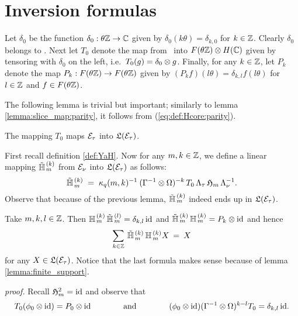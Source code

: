 \section{Inversion formulas}
\label{sect:inversion}


\begin{defn}
Let $\delta_0$ be the function $\delta_0: \theta \ZZ \rarr \CC$
given by $\delta_0(k\theta)=\delta_{k,0}$ for $k\in\ZZ$.
Clearly $\delta_0$ belongs to \KZeven\@. Next let $T_0$ denote the map
from \HC\ into $\FZ \tens \HC$ given by tensoring with $\delta_0$ on the
left, i.e.\ $T_0(g)=\delta_0 \tens g$.
Finally, for any $k\in\ZZ$, let $P_k$ denote the map
$P_k : \FZ \rarr \FZ$ given by  $(P_k f)(l\theta)=\delta_{k,l} f(l\theta)$
for $l\in\ZZ$ and $f\in\FZ$.
\end{defn}

The following lemma is trivial but important; similarly to
lemma \ref{lemma:slice_map:parity}, it follows from (\ref{eq:def:Hcore:parity}).

\begin{lemma}
The  mapping $T_0$ maps $\Hcore_\tau$ into $\calL(\Hcore_\tau)$.
\end{lemma}

\begin{defn}
First recall definition \ref{def:YaH}\@.
Now for any $m,k\in\ZZ$, we define a linear mapping $\Htil{m}{k}$
from $\Hcore_\nu$ into $\calL(\Hcore_\tau)$ as follows:
$$ \Htil{m}{k} \;=\;
   \kq(m,k)^{-1} \: (\Gamma^{-1} \tens \Omega)^{-k}\,
            T_0\, \Lambda_\tau \, \holH{m} \, \Lambda_\nu^{-1}. $$
Observe that because of the previous lemma, $\Htil{m}{k}$ indeed ends up in
$\calL(\Hcore_\tau)$.
\end{defn}


\begin{lemma}
Take $m,k,l\in\ZZ$. Then $\YaH{m}{k} \,\Htil{m}{l} = \delta_{k,l} \,\id$ and\/
$\Htil{m}{k} \,\YaH{m}{k} = P_k \tens \id$ and hence
$$ \sum_{k\in\ZZ}\: \Htil{m}{k}\, \YaH{m}{k} X  \:=\: X $$
for any $X\in \calL(\Hcore_\tau)$.
Notice that the last formula makes sense because of lemma \ref{lemma:finite_support}\@.
\end{lemma}
{\em proof.}
Recall $\holH{m}^{2} = \id$ and observe that
$$ T_0 (\evzero \tens \id) = P_0 \tens \id
             \andspace{4em}
(\evzero \tens \id) (\Gamma^{-1} \tens \Omega)^{k-l}T_0 = \delta_{k,l} \, \id.$$



